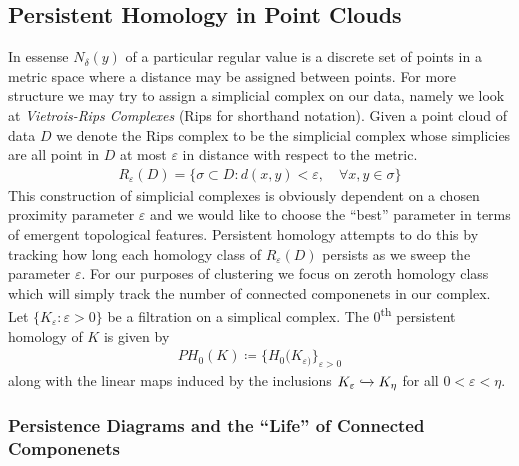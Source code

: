 \documentclass[12pt]{article}
\begin{document}
\subsection{Persistent Homology in Point Clouds}
In essense $N_{\delta}(y)$ of a particular regular value is a discrete set of points in a metric space where a distance may be assigned between points. For more structure we may try to assign a simplicial complex on our data, namely we look at \textit{Vietrois-Rips Complexes} (Rips for shorthand notation). Given a point cloud of data $D$ we denote the Rips complex to be the simplicial complex whose simplicies are all point in $D$ at most $\varepsilon$ in distance with respect to the metric.
\begin{align}
	R_{\varepsilon}(D) = \{ \sigma \subset D : d(x,y)<\varepsilon,\quad \forall x,y \in \sigma\}
\end{align}
This construction of simplicial complexes is obviously dependent on a chosen proximity parameter $\varepsilon$ and we would like to choose the ``best'' parameter in terms of emergent topological features. Persistent homology attempts to do this by tracking how long each homology class of $R_{\varepsilon}(D)$ persists as we sweep the parameter $\varepsilon$. For our purposes of clustering we focus on zeroth homology class which will simply track the number of connected componenets in our complex. Let $\{K_{\varepsilon}:\varepsilon > 0 \}$ be a filtration on a simplical complex. The $0$\textsuperscript{th} persistent homology of $K$ is given by
\begin{align}
	PH_0(K) \coloneqq \{H_0(K_{\varepsilon)}\}_{\varepsilon>0}
\end{align}
along with the linear maps induced by the inclusions $K_{\varepsilon} \xhookrightarrow{} K_{\eta}$ for all $0<\varepsilon < \eta$.
\subsubsection{Persistence Diagrams and the ``Life'' of Connected Componenets}
\end{document}
